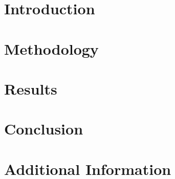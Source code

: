 \documentclass[11pt,a4paper]{report}
\begin{document}



% 

\tableofcontents
\clearpage


\chapter{Introduction}
\label{chap:introduction}


\chapter{Methodology}
\label{chap:methodology}


\chapter{Results}
\label{chap:results}


\chapter{Conclusion}
\label{chap:conclusion}



\appendix

\chapter{Additional Information}
\label{app:additional}



\printbibliography[heading=bibintoc]
\end{document}
